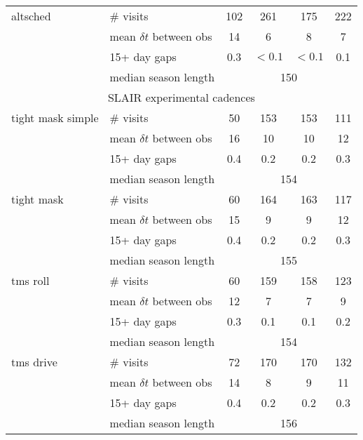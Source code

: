 \begin{appendices}
\begin{longtable}{l|l|cccc}
  altsched       & \# visits                   & 102  & 261  & 175  & 222  \\
                 & mean $\delta t$ between obs &  14  &   6  &   8  &   7  \\
                 & 15+ day gaps                & 0.3  &$<0.1$&$<0.1$&  0.1 \\
                 & median season length               & \multicolumn{4}{c}{150}   \\
  \hline
  \hline
  \multicolumn{6}{c}{SLAIR experimental cadences}\\
  \hline

tight mask simple& \# visits                   &  50  & 153  & 153  & 111  \\
                 & mean $\delta t$ between obs &  16  &  10  &  10  &  12  \\
                 & 15+ day gaps                & 0.4  & 0.2  & 0.2  & 0.3  \\
                 & median season length               & \multicolumn{4}{c}{154}   \\
  \hline

tight mask       & \# visits                   &  60  & 164  & 163  & 117  \\
                 & mean $\delta t$ between obs &  15  &   9  &   9  &  12  \\
                 & 15+ day gaps                & 0.4  & 0.2  & 0.2  & 0.3  \\
                 & median season length               & \multicolumn{4}{c}{155}   \\
  \hline

tms roll         & \# visits                   &  60  & 159  & 158  &  123 \\
                 & mean $\delta t$ between obs &  12  &   7  &   7  &    9 \\
                 & 15+ day gaps                & 0.3  & 0.1  & 0.1  &  0.2 \\
                 & median season length               & \multicolumn{4}{c}{154}   \\
  \hline

tms drive        & \# visits                   &  72  & 170  & 170  & 132  \\
                 & mean $\delta t$ between obs &  14  &   8  &   9  &  11  \\
                 & 15+ day gaps                & 0.4  & 0.2  & 0.2  & 0.3  \\
                 & median season length               & \multicolumn{4}{c}{156}   \\
  \hline


\end{longtable}
\end{appendices}
